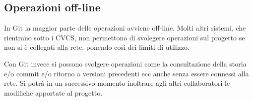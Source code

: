 \subsection{Operazioni off-line}
In Git la maggior parte delle operazioni avviene off-line. Molti altri sistemi, che rientrano sotto i CVCS, non permettono di svolegere operazioni sul progetto se non si è collegati alla rete, ponendo cosi dei limiti di utilizzo.

Con Git invece si possono svolgere operazioni come la consultazione della storia e/o commit e/o ritorno a versioni precedenti ecc anche senza essere connessi alla rete. Si potrà in un successivo momento inoltrare agli altri collaboratori le modifiche apportate al progetto.